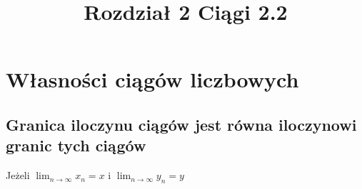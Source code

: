 \documentclass[12pt, letterpaper, twoside]{article}
\title{Rozdział 2 Ciągi 2.2}
\author{}
\date{}
\begin{document}
\begin{titlepage}
\maketitle
\end{titlepage}


\section{Własności ciągów liczbowych}
\subsection{Granica iloczynu ciągów jest równa iloczynowi granic tych ciągów}

Jeżeli $\lim_{n\to\infty} x_n = x$ i $\lim_{n\to\infty} y_n = y$
\end{document}
